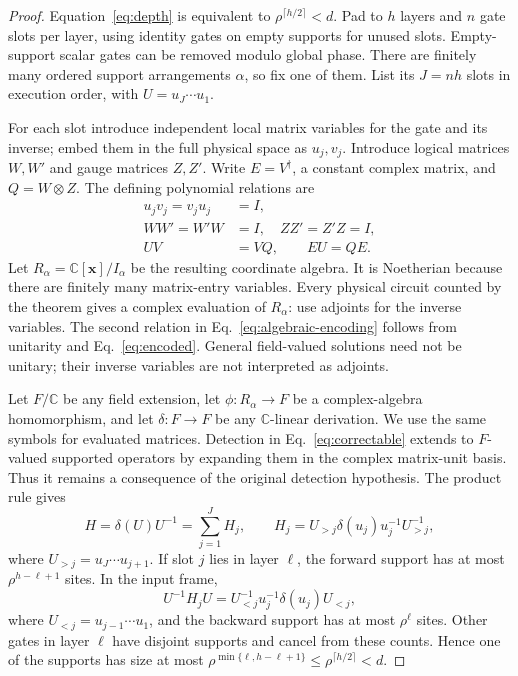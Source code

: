 \documentclass[aps,prl,reprint,notitlepage,nofootinbib,nobibnotes]{revtex4-2}
\newcommand{\id}{I}
\begin{document}
\begin{proof}
Equation~\eqref{eq:depth} is equivalent to
\(\rho^{\lceil h/2\rceil}<d\).
Pad to \(h\) layers and \(n\) gate slots per layer, using identity gates
on empty supports for unused slots. Empty-support scalar gates can be
removed modulo global phase. There are finitely many ordered support
arrangements \(\alpha\), so fix one of them. List its \(J=nh\) slots in
execution order, with \(U=u_J\cdots u_1\).

For each slot introduce independent local matrix variables for the
gate and its inverse; embed them in the full physical space as
\(u_j,v_j\). Introduce logical matrices \(W,W'\) and gauge matrices
\(Z,Z'\). Write \(E=V^\dagger\), a constant complex matrix, and
\(Q=W\otimes Z\). The defining polynomial relations are
\begin{align}
 u_jv_j=v_ju_j&=\id,\nonumber\\
 WW'=W'W&=\id,\quad ZZ'=Z'Z=\id,\label{eq:algebraic-inverses}\\
 UV&=VQ,\qquad EU=QE.\label{eq:algebraic-encoding}
\end{align}
Let \(R_\alpha=\mathbb C[\mathbf x]/I_\alpha\) be the resulting
coordinate algebra. It is Noetherian because there are finitely many
matrix-entry variables. Every physical circuit counted by the theorem
gives a complex evaluation of \(R_\alpha\): use adjoints for the inverse
variables. The second relation in Eq.~\eqref{eq:algebraic-encoding}
follows from unitarity and Eq.~\eqref{eq:encoded}.
General field-valued solutions need not be unitary; their inverse
variables are not interpreted as adjoints.

Let \(F/\mathbb C\) be any field extension, let
\(\phi:R_\alpha\to F\) be a complex-algebra homomorphism, and let
\(\delta:F\to F\) be any \(\mathbb C\)-linear derivation. We use the same
symbols for evaluated matrices. Detection in Eq.~\eqref{eq:correctable}
extends to \(F\)-valued supported operators by expanding them in the
complex matrix-unit basis. Thus it remains a consequence of the
original detection hypothesis. The product rule gives
\begin{equation}\label{eq:generator}
 H=\delta(U)U^{-1}=\sum_{j=1}^{J}H_j,\qquad
 H_j=U_{>j}\delta(u_j)u_j^{-1}U_{>j}^{-1},
\end{equation}
where \(U_{>j}=u_J\cdots u_{j+1}\). If slot \(j\) lies in layer
\(\ell\), the forward support has at most \(\rho^{h-\ell+1}\) sites.
In the input frame,
\[
 U^{-1}H_jU=U_{<j}^{-1}u_j^{-1}\delta(u_j)U_{<j},
\]
where \(U_{<j}=u_{j-1}\cdots u_1\), and the backward support has at
most \(\rho^\ell\) sites. Other gates in layer \(\ell\) have disjoint
supports and cancel from these counts. Hence one of the supports has
size at most \(\rho^{\min\{\ell,h-\ell+1\}}\le\rho^{\lceil h/2\rceil}<d\).


\end{proof}
\end{document}
